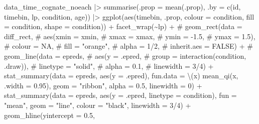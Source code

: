 \documentclass[
  letterpaper,
  DIV=11,
  numbers=noendperiod]{scrartcl}
\newenvironment{Shaded}{\begin{snugshade}}{\end{snugshade}}
\newcommand{\AttributeTok}[1]{\textcolor[rgb]{0.40,0.45,0.13}{#1}}
\newcommand{\CommentTok}[1]{\textcolor[rgb]{0.37,0.37,0.37}{#1}}
\newcommand{\DecValTok}[1]{\textcolor[rgb]{0.68,0.00,0.00}{#1}}
\newcommand{\FloatTok}[1]{\textcolor[rgb]{0.68,0.00,0.00}{#1}}
\newcommand{\FunctionTok}[1]{\textcolor[rgb]{0.28,0.35,0.67}{#1}}
\newcommand{\NormalTok}[1]{\textcolor[rgb]{0.00,0.23,0.31}{#1}}
\newcommand{\SpecialCharTok}[1]{\textcolor[rgb]{0.37,0.37,0.37}{#1}}
\newcommand{\StringTok}[1]{\textcolor[rgb]{0.13,0.47,0.30}{#1}}
\begin{document}
\begin{Shaded}
\begin{Highlighting}[]
\NormalTok{data\_time\_cognate\_noeach }\SpecialCharTok{|\textgreater{}} 
    \FunctionTok{summarise}\NormalTok{(}\AttributeTok{.prop =} \FunctionTok{mean}\NormalTok{(.prop),}
              \AttributeTok{.by =} \FunctionTok{c}\NormalTok{(id, timebin, lp, condition, age)) }\SpecialCharTok{|\textgreater{}} 
    \FunctionTok{ggplot}\NormalTok{(}\FunctionTok{aes}\NormalTok{(timebin, .prop, }
               \AttributeTok{colour =}\NormalTok{ condition,}
               \AttributeTok{fill =}\NormalTok{ condition,}
               \AttributeTok{shape =}\NormalTok{ condition)) }\SpecialCharTok{+}
    \FunctionTok{facet\_wrap}\NormalTok{(}\SpecialCharTok{\textasciitilde{}}\NormalTok{lp) }\SpecialCharTok{+}
    \CommentTok{\# geom\_rect(data = diff\_rect,}
    \CommentTok{\#         aes(xmin = xmin,}
    \CommentTok{\#           xmax = xmax,}
    \CommentTok{\#           ymin = {-}1.5,}
    \CommentTok{\#           ymax = 1.5),}
    \CommentTok{\#         colour = NA,}
    \CommentTok{\#         fill = "orange",}
    \CommentTok{\#         alpha = 1/2,}
    \CommentTok{\#         inherit.aes = FALSE) +}
    \CommentTok{\# geom\_line(data = epreds,}
    \CommentTok{\#         aes(y = .epred,}
\CommentTok{\#           group = interaction(condition, .draw)),}
\CommentTok{\#         linetype = "solid",}
\CommentTok{\#         alpha = 0.1,}
\CommentTok{\#         linewidth = 3/4) +}
\FunctionTok{stat\_summary}\NormalTok{(}\AttributeTok{data =}\NormalTok{ epreds,}
             \FunctionTok{aes}\NormalTok{(}\AttributeTok{y =}\NormalTok{ .epred),}
             \AttributeTok{fun.data =}\NormalTok{ \textbackslash{}(x) }\FunctionTok{mean\_qi}\NormalTok{(x, }\AttributeTok{.width =} \FloatTok{0.95}\NormalTok{),}
             \AttributeTok{geom =} \StringTok{"ribbon"}\NormalTok{,}
             \AttributeTok{alpha =} \FloatTok{0.5}\NormalTok{,}
             \AttributeTok{linewidth =} \DecValTok{0}\NormalTok{) }\SpecialCharTok{+}
    \FunctionTok{stat\_summary}\NormalTok{(}\AttributeTok{data =}\NormalTok{ epreds,}
                 \FunctionTok{aes}\NormalTok{(}\AttributeTok{y =}\NormalTok{ .epred,}
                    \AttributeTok{linetype =}\NormalTok{ condition),}
                 \AttributeTok{fun =} \StringTok{"mean"}\NormalTok{,}
                 \AttributeTok{geom =} \StringTok{"line"}\NormalTok{,}
                 \AttributeTok{colour =} \StringTok{"black"}\NormalTok{,}
                 \AttributeTok{linewidth =} \DecValTok{3}\SpecialCharTok{/}\DecValTok{4}\NormalTok{) }\SpecialCharTok{+}
    \FunctionTok{geom\_hline}\NormalTok{(}\AttributeTok{yintercept =} \FloatTok{0.5}\NormalTok{, }

\end{Highlighting}
\end{Shaded}
\end{document}
